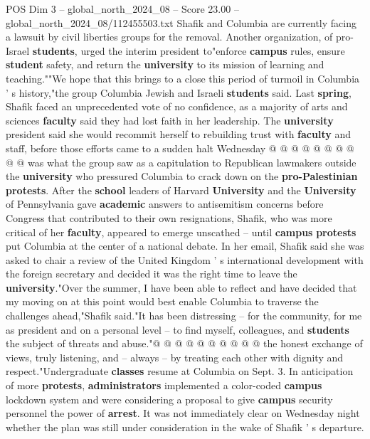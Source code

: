 \begin{textsample}{POS Dim 3 – global\_north\_2024\_08 – Score 23.00 – global\_north\_2024\_08/112455503.txt}
Shafik and Columbia are currently facing a lawsuit by civil liberties groups for the removal.
Another organization, of pro-Israel \textbf{students}, urged the interim president to"enforce \textbf{campus} rules, ensure \textbf{student} safety, and return the \textbf{university} to its mission of learning and teaching.""We hope that this brings to a close this period of turmoil in Columbia ' s history,"the group Columbia Jewish and Israeli \textbf{students} said.
Last \textbf{spring}, Shafik faced an unprecedented vote of no confidence, as a majority of arts and sciences \textbf{faculty} said they had lost faith in her leadership.
The \textbf{university} president said she would recommit herself to rebuilding trust with \textbf{faculty} and staff, before those efforts came to a sudden halt Wednesday @ @ @ @ @ @ @ @ @ @ was what the group saw as a capitulation to Republican lawmakers outside the \textbf{university} who pressured Columbia to crack down on the \textbf{pro-Palestinian} \textbf{protests}.
After the \textbf{school} leaders of Harvard \textbf{University} and the \textbf{University} of Pennsylvania gave \textbf{academic} answers to antisemitism concerns before Congress that contributed to their own resignations, Shafik, who was more critical of her \textbf{faculty}, appeared to emerge unscathed -- until \textbf{campus} \textbf{protests} put Columbia at the center of a national debate.
In her email, Shafik said she was asked to chair a review of the United Kingdom ' s international development with the foreign secretary and decided it was the right time to leave the \textbf{university}."Over the summer, I have been able to reflect and have decided that my moving on at this point would best enable Columbia to traverse the challenges ahead,"Shafik said."It has been distressing -- for the community, for me as president and on a personal level -- to find myself, colleagues, and \textbf{students} the subject of threats and abuse."@ @ @ @ @ @ @ @ @ @ the honest exchange of views, truly listening, and -- always -- by treating each other with dignity and respect."Undergraduate \textbf{classes} resume at Columbia on Sept. 3.
In anticipation of more \textbf{protests}, \textbf{administrators} implemented a color-coded \textbf{campus} lockdown system and were considering a proposal to give \textbf{campus} security personnel the power of \textbf{arrest}.
It was not immediately clear on Wednesday night whether the plan was still under consideration in the wake of Shafik ' s departure.

\end{textsample}
